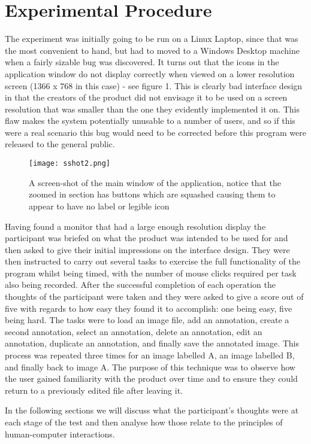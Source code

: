 \section{Experimental Procedure}

The experiment was initially going to be run on a Linux Laptop, since that was the most convenient to hand, but had to moved to a Windows Desktop machine when a fairly sizable bug was discovered.  It turns out that the icons in the application window do not display correctly when viewed on a lower resolution screen (1366 x 768 in this case) - see figure 1.  This is clearly bad interface design in that the creators of the product did not envisage it to be used on a screen resolution that was smaller than the one they evidently implemented it on.  This flaw makes the system potentially unusable to a number of users, and so if this were a real scenario this bug would need to be corrected before this program were released to the general public.

\begin{figure}[t]
\centering
\texttt{[image: sshot2.png]}
\caption{A screen-shot of the main window of the application, notice that the zoomed in section has buttons which are squashed causing them to appear to have no label or legible icon}
\label{fig:fullView}
\end{figure}

Having found a monitor that had a large enough resolution display the participant was briefed on what the product was intended to be used for and then asked to give their initial impressions on the interface design.  They were then instructed to carry out several tasks to exercise the full functionality of the program whilst being timed, with the number of mouse clicks required per task also being recorded.  After the successful completion of each operation the thoughts of the participant were taken and they were asked to give a score out of five with regards to how easy they found it to accomplish: one being easy, five being hard.  The tasks were to load an image file, add an annotation, create a second annotation, select an annotation, delete an annotation, edit an annotation, duplicate an annotation, and finally save the annotated image.  This process was repeated three times for an image labelled A, an image labelled B, and finally back to image A.  The purpose of this technique was to observe how the user gained familiarity with the product over time and to ensure they could return to a previously edited file after leaving it.

In the following sections we will discuss what the participant’s thoughts were at each stage of the test and then analyse how those relate to the principles of human-computer interactions.
